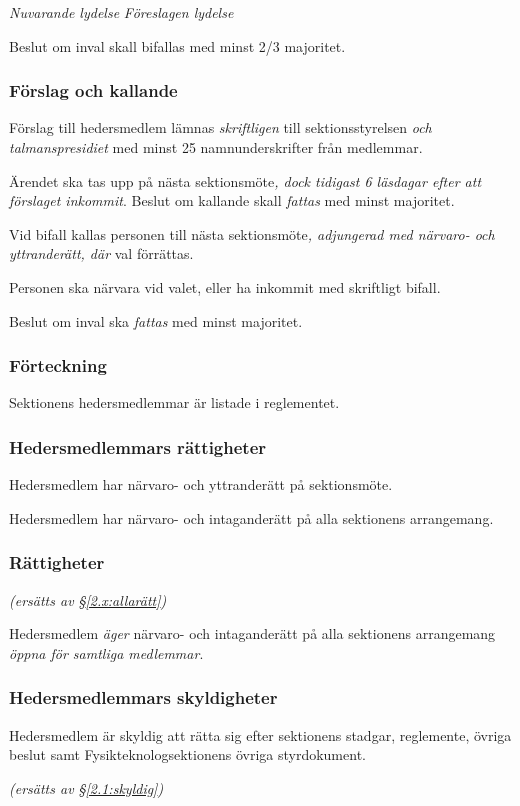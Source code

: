 \documentclass{article}
\newenvironment{lydelse}
    {\begin{paracol}{2}%
        \emph{Nuvarande lydelse}%
        \switchcolumn%
        \emph{Föreslagen lydelse}%
    \end{paracol}%
    \begin{enumerate}[label=\thesubsection.\arabic*]%
    \begin{paracol}{2}%
    }{\end{paracol}\end{enumerate}}
\newcommand{\itemb}{\item[\textbullet]}
\begin{document}
\begin{lydelse}
    \itemb Beslut om inval skall bifallas med minst 2/3 majoritet.
    
\switchcolumn
    \subsubsection*{Förslag och kallande}%
    
    \item Förslag till hedersmedlem lämnas \emph{skriftligen} till sektionsstyrelsen \emph{och talmanspresidiet} med minst 25 namnunderskrifter från medlemmar.

    \item Ärendet ska tas upp på nästa sektionsmöte\emph{, dock tidigast 6 läsdagar efter att förslaget inkommit}.
    Beslut om kallande skall \emph{fattas} med minst  majoritet. \label{maj:hm1}
    
    \item Vid bifall kallas personen till nästa sektionsmöte\emph{, adjungerad med närvaro- och yttranderätt, där} val förrättas.

    \item Personen ska närvara vid valet, eller ha inkommit med skriftligt bifall.

    \item Beslut om inval ska \emph{fattas} med minst  majoritet. \label{maj:hm2}
    
\switchcolumn*
    \subsubsection*{Förteckning}%
    \itemb Sektionens hedersmedlemmar är listade i reglementet.
    
\switchcolumn
\switchcolumn*
    \subsubsection*{Hedersmedlemmars rättigheter}%
    \itemb Hedersmedlem har närvaro- och yttranderätt på sektionsmöte.
    
    \itemb Hedersmedlem har närvaro- och intaganderätt på alla sektionens
arrangemang.
    
\switchcolumn
    \subsubsection*{Rättigheter}%
    \emph{(ersätts av \S \ref{2.x:allarätt})}
    
    \item Hedersmedlem \emph{äger} närvaro- och intaganderätt på alla sektionens arrangemang \emph{öppna för samtliga medlemmar}.

\switchcolumn*
    \subsubsection*{Hedersmedlemmars skyldigheter}%
    \itemb Hedersmedlem är skyldig att rätta sig efter sektionens stadgar, regle\-mente, övriga beslut samt  Fysikteknologsektionens övriga styrdokument.
    
\switchcolumn
    \emph{(ersätts av \S \ref{2.1:skyldig})}
\end{lydelse}
\end{document}
